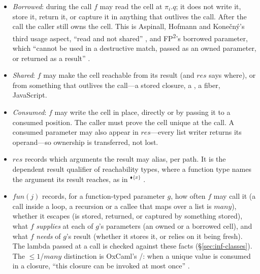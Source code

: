 \begin{itemize}
\item \emph{Borrowed}: during the call $f$ may read the cell at $\pi_i.q$; it does not write it,
store it, return it, or capture it in anything that outlives the call. After the call the caller
still owns the cell. This is Aspinall, Hofmann and Kone\v{c}n\'y's third usage aspect, ``read and not
shared'' \citep[\S1]{aspinall2008usage}, and FP\textsuperscript{2}'s borrowed parameter, which
``cannot be used in a destructive match, passed as an owned parameter, or returned as a result''
\citep[\S1.3]{lorenzen2023fp2}.
\item \emph{Shared}: $f$ may make the cell reachable from its result (and $\mathit{res}$ says where),
or from something that outlives the call---a stored closure, a , a fiber, JavaScript.
\item \emph{Consumed}: $f$ may write the cell in place, directly or by passing it to a consumed
position. The caller must prove the cell unique at the call. A consumed parameter may also appear
in $\mathit{res}$---every list writer returns its operand---so ownership is transferred, not lost.
\item $\mathit{res}$ records which arguments the result may alias, per path. It is the dependent
result qualifier of reachability types, where a function type names the argument its result
reaches, as in $^{\blacklozenge}$$^{\{x\}}$ \citep[\S2.2]{wei2024polymorphic}.
\item $\mathit{fun}(j)$ records, for a function-typed parameter $g$, how often $f$ may call it (a
call inside a loop, a recursion or a callee that maps over a list is $\mathit{many}$), whether it
escapes (is stored, returned, or captured by something stored), what $f$ \emph{supplies} at each of
$g$'s parameters (an owned or a borrowed cell), and what $f$ \emph{needs} of $g$'s result (whether
it stores it, or relies on it being fresh). The lambda passed at a call is checked against these
facts (\S\ref{sec:inf-classes}). The ${\le}1$/$\mathit{many}$ distinction is OxCaml's
/: when a unique value is consumed in a closure, ``this closure can be
invoked at most once'' \citep{oxcaml2025uniqueness,lorenzen2024oxidizing}.
\end{itemize}

